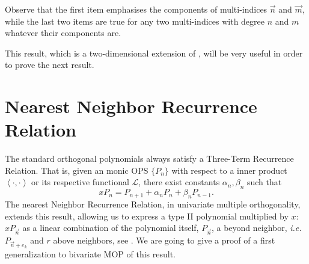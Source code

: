 \documentclass[12pt,a4]{article}
\theoremstyle{plain}
\newcommand{\prodesc}[2]{\left\langle #1 , #2 \right\rangle}
\begin{document}
Observe that the first item emphasises the components of multi-indices $\vec n$ and $\vec m$, while the last two items are true for any two multi-indices with degree $n$ and $m$ whatever their components are.

This result, which is a two-dimensional extension of \cite[Theorem 23.1.6]{Ismail}, will be very useful in order to prove the next result.

\section{Nearest Neighbor Recurrence Relation}

The standard orthogonal polynomials always satisfy a Three-Term Recurrence Relation. That is, given an monic OPS $\{P_n\}$ with respect to a inner product $\prodesc{\cdot}{\cdot}$ or its respective functional $\mathcal L$, there exist constants $\alpha_n,\beta_n$ such that
$$
xP_n = P_{n+1}+ \alpha_n P_n + \beta_n P_{n-1}.
$$
The nearest Neighbor Recurrence Relation, in univariate multiple orthogonality, extends this result, allowing us to express a type II polynomial multiplied by $x$: $xP_{\vec n}$ as a linear combination of the polynomial itself, $P_{\vec n}$, a beyond neighbor, \textit{i.e.} $P_{\vec n + e_k}$ and $r$ above neighbors, see \cite[Theorem 23.1.7]{Ismail}. We are going to give a proof of a first generalization to bivariate MOP of this result. 
\end{document}
